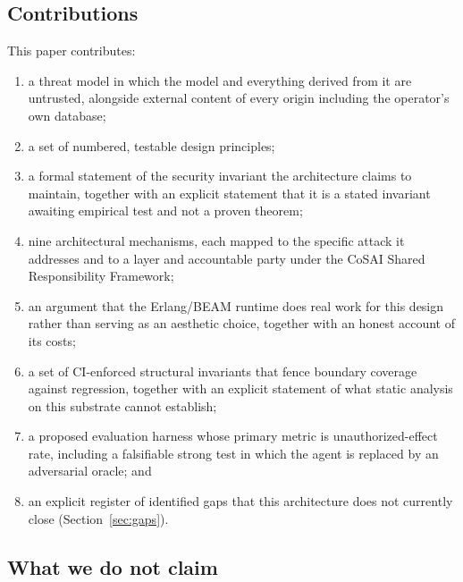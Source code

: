 \documentclass[11pt,letterpaper]{article}
\begin{document}
\subsection{Contributions}\label{sec:intro-contributions}

This paper contributes:
\begin{enumerate}[leftmargin=1.6em,itemsep=0.15em,topsep=0.3em]
  \item a threat model in which the model and everything derived from it are untrusted, alongside external content of every origin including the operator's own database;
  \item a set of numbered, testable design principles;
  \item a formal statement of the security invariant the architecture claims to maintain, together with an explicit statement that it is a stated invariant awaiting empirical test and not a proven theorem;
  \item nine architectural mechanisms, each mapped to the specific attack it addresses and to a layer and accountable party under the CoSAI Shared Responsibility Framework;
  \item an argument that the Erlang/BEAM runtime does real work for this design rather than serving as an aesthetic choice, together with an honest account of its costs;
  \item a set of CI-enforced structural invariants that fence boundary coverage against regression, together with an explicit statement of what static analysis on this substrate cannot establish;
  \item a proposed evaluation harness whose primary metric is unauthorized-effect rate, including a falsifiable strong test in which the agent is replaced by an adversarial oracle; and
  \item an explicit register of identified gaps that this architecture does not currently close (Section~\ref{sec:gaps}).
\end{enumerate}

\subsection{What we do not claim}\label{sec:intro-nonclaims}
\end{document}
